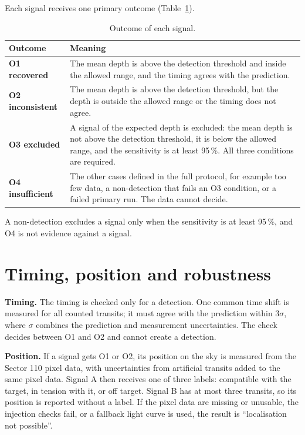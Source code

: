 \documentclass{aastex702}
\renewcommand{\_}{\origunderscore\allowbreak}
\newcommand{\runin}[1]{\par\smallskip\noindent\textbf{#1}\enspace}
\begin{document}
Each signal receives one primary outcome (Table~\ref{tab:out}).

\begin{table}[ht]
\caption{Outcome of each signal.\label{tab:out}}
\begin{tabular}{@{}>{\raggedright\arraybackslash}p{}>{\raggedright\arraybackslash}p{}@{}}
\toprule
Outcome & Meaning \\
\midrule
\textbf{O1 recovered} & The mean depth is above the detection threshold and inside the allowed range, and the
  timing agrees with the prediction. \\
\textbf{O2 inconsistent} & The mean depth is above the detection threshold, but the depth is outside the allowed range
  or the timing does not agree. \\
\textbf{O3 excluded} & A signal of the expected depth is excluded: the mean depth is not above the detection threshold,
  it is below the allowed range, and the sensitivity is at least 95\,\%. All three conditions are required. \\
\textbf{O4 insufficient} & The other cases defined in the full protocol, for example too few data, a non-detection
  that fails an O3 condition, or a failed primary run. The data cannot decide. \\
\bottomrule
\end{tabular}
\end{table}

A non-detection excludes a signal only when the sensitivity is at least 95\,\%, and O4 is not evidence against a
signal.

\section{Timing, position and robustness}

\runin{Timing.} The timing is checked only for a detection. One common time shift is measured for all counted
transits; it must agree with the prediction within $3\sigma$, where $\sigma$ combines the prediction and measurement
uncertainties. The check decides between O1 and O2 and cannot create a detection.

\runin{Position.} If a signal gets O1 or O2, its position on the sky is measured from the Sector 110 pixel data, with
uncertainties from artificial transits added to the same pixel data. Signal A then receives one of three labels:
compatible with the target, in tension with it, or off target. Signal B has at most three transits, so its position is
reported without a label. If the pixel data are missing or unusable, the injection checks fail, or a fallback light
curve is used, the result is ``localisation not possible''.
\end{document}
